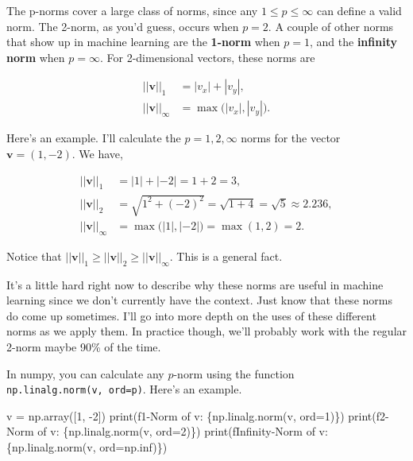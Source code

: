 \documentclass[
  letterpaper,
  DIV=11,
  numbers=noendperiod]{scrreprt}
\newenvironment{Shaded}{\begin{snugshade}}{\end{snugshade}}
\newcommand{\BuiltInTok}[1]{\textcolor[rgb]{0.00,0.23,0.31}{#1}}
\newcommand{\DecValTok}[1]{\textcolor[rgb]{0.68,0.00,0.00}{#1}}
\newcommand{\NormalTok}[1]{\textcolor[rgb]{0.00,0.23,0.31}{#1}}
\newcommand{\OperatorTok}[1]{\textcolor[rgb]{0.37,0.37,0.37}{#1}}
\newcommand{\SpecialCharTok}[1]{\textcolor[rgb]{0.37,0.37,0.37}{#1}}
\newcommand{\SpecialStringTok}[1]{\textcolor[rgb]{0.13,0.47,0.30}{#1}}
\begin{document}
The p-norms cover a large class of norms, since any
\(1 \leq p \leq \infty\) can define a valid norm. The 2-norm, as you'd
guess, occurs when \(p=2\). A couple of other norms that show up in
machine learning are the \textbf{1-norm} when \(p=1\), and the
\textbf{infinity norm} when \(p=\infty\). For 2-dimensional vectors,
these norms are

\begin{align*}
||\mathbf{v}||_1 &= |v_x| + |v_y|, \\
||\mathbf{v}||_\infty &= \max\big(|v_x|, |v_y|\big).
\end{align*}

Here's an example. I'll calculate the \(p=1, 2, \infty\) norms for the
vector \(\mathbf{v}=(1,-2)\). We have,

\begin{align*}
||\mathbf{v}||_1 &= |1| + |-2| = 1 + 2 = 3, \\
||\mathbf{v}||_2 &= \sqrt{1^2 + (-2)^2} = \sqrt{1 + 4} = \sqrt{5} \approx 2.236, \\
||\mathbf{v}||_\infty &= \max\big(|1|, |-2|\big) = \max(1, 2) = 2.
\end{align*}

Notice that
\(||\mathbf{v}||_1 \geq ||\mathbf{v}||_2 \geq ||\mathbf{v}||_\infty\).
This is a general fact.

It's a little hard right now to describe why these norms are useful in
machine learning since we don't currently have the context. Just know
that these norms do come up sometimes. I'll go into more depth on the
uses of these different norms as we apply them. In practice though,
we'll probably work with the regular 2-norm maybe 90\% of the time.

In numpy, you can calculate any \(p\)-norm using the function
\texttt{np.linalg.norm(v,\ ord=p)}. Here's an example.

\begin{Shaded}
\begin{Highlighting}[]
\NormalTok{v }\OperatorTok{=}\NormalTok{ np.array([}\DecValTok{1}\NormalTok{, }\OperatorTok{{-}}\DecValTok{2}\NormalTok{])}
\BuiltInTok{print}\NormalTok{(}\SpecialStringTok{f\textquotesingle{}1{-}Norm of v: }\SpecialCharTok{\{}\NormalTok{np}\SpecialCharTok{.}\NormalTok{linalg}\SpecialCharTok{.}\NormalTok{norm(v, }\BuiltInTok{ord}\OperatorTok{=}\DecValTok{1}\NormalTok{)}\SpecialCharTok{\}}\SpecialStringTok{\textquotesingle{}}\NormalTok{)}
\BuiltInTok{print}\NormalTok{(}\SpecialStringTok{f\textquotesingle{}2{-}Norm of v: }\SpecialCharTok{\{}\NormalTok{np}\SpecialCharTok{.}\NormalTok{linalg}\SpecialCharTok{.}\NormalTok{norm(v, }\BuiltInTok{ord}\OperatorTok{=}\DecValTok{2}\NormalTok{)}\SpecialCharTok{\}}\SpecialStringTok{\textquotesingle{}}\NormalTok{)}
\BuiltInTok{print}\NormalTok{(}\SpecialStringTok{f\textquotesingle{}Infinity{-}Norm of v: }\SpecialCharTok{\{}\NormalTok{np}\SpecialCharTok{.}\NormalTok{linalg}\SpecialCharTok{.}\NormalTok{norm(v, }\BuiltInTok{ord}\OperatorTok{=}\NormalTok{np.inf)}\SpecialCharTok{\}}\SpecialStringTok{\textquotesingle{}}\NormalTok{)}
\end{Highlighting}
\end{Shaded}
\end{document}
